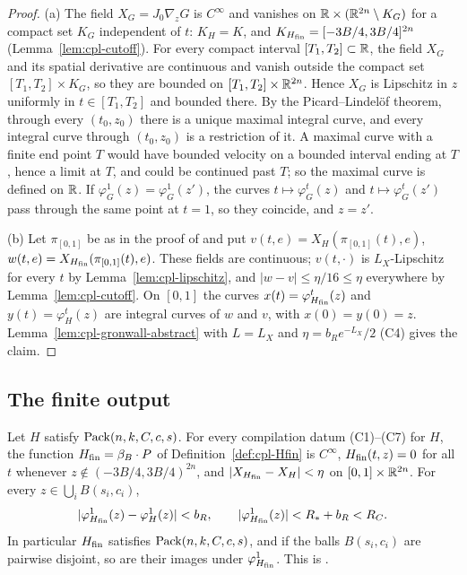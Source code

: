 \begin{proof}
(a) The field $X_G=J_0\nabla_zG$ is $C^\infty$ and vanishes on $\mathbb{R}\times(\mathbb{R}^{2n}\setminus K_G)$ for a compact set
$K_G$ independent of $t$: $K_H=K$, and $K_{H_{\mathrm{fin}}}=[-3B/4,3B/4]^{2n}$ (Lemma~\ref{lem:cpl-cutoff}). For every compact
interval $[T_1,T_2]\subset\mathbb{R}$, the field $X_G$ and its spatial derivative are continuous and vanish outside the
compact set $[T_1,T_2]\times K_G$, so they are bounded on $[T_1,T_2]\times\mathbb{R}^{2n}$. Hence $X_G$ is Lipschitz in $z$
uniformly in $t\in[T_1,T_2]$ and bounded there. By the Picard--Lindel\"of theorem, through every $(t_0,z_0)$ there is
a unique maximal integral curve, and every integral curve through $(t_0,z_0)$ is a restriction of it. A maximal
curve with a finite end point $T$ would have bounded velocity on a bounded interval ending at $T$, hence a limit at
$T$, and could be continued past $T$; so the maximal curve is defined on $\mathbb{R}$. If $\varphi^1_G(z)=\varphi^1_G(z')$,
the curves $t\mapsto\varphi^t_G(z)$ and $t\mapsto\varphi^t_G(z')$ pass through the same point at $t=1$, so they
coincide, and $z=z'$.

(b) Let $\pi_{[0,1]}$ be as in the proof of  and put $v(t,e)=X_H(\pi_{[0,1]}(t),e)$,
$w(t,e)=X_{H_{\mathrm{fin}}}(\pi_{[0,1]}(t),e)$. These fields are continuous; $v(t,\cdot)$ is $L_X$-Lipschitz for every $t$ by
Lemma~\ref{lem:cpl-lipschitz}, and $|w-v|\le\eta/16\le\eta$ everywhere by Lemma~\ref{lem:cpl-cutoff}. On $[0,1]$ the
curves $x(t)=\varphi^t_{H_{\mathrm{fin}}}(z)$ and $y(t)=\varphi^t_H(z)$ are integral curves of $w$ and $v$, with $x(0)=y(0)=z$.
Lemma~\ref{lem:cpl-gronwall-abstract} with $L=L_X$ and $\eta=b_Re^{-L_X}/2$ (C4) gives the claim.
\end{proof}

\subsection{The finite output}\label{sec:cpl-final}

\begin{theorem}\label{thm:cpl-final}
Let $H$ satisfy $\mathrm{Pack}(n,k,C,c,s)$. For every compilation datum (C1)--(C7) for $H$, the function
$H_{\mathrm{fin}}=\beta_B\cdot P$ of Definition~\ref{def:cpl-Hfin} is $C^\infty$, $H_{\mathrm{fin}}(t,z)=0$ for all $t$ whenever
$z\notin(-3B/4,3B/4)^{2n}$, and $|X_{H_{\mathrm{fin}}}-X_H|<\eta$ on $[0,1]\times\mathbb{R}^{2n}$. For every $z\in\bigcup_iB(s_i,c_i)$,
\[
 |\varphi^1_{H_{\mathrm{fin}}}(z)-\varphi^1_H(z)|<b_R,\qquad |\varphi^1_{H_{\mathrm{fin}}}(z)|<R_*+b_R<R_C .
\]
In particular $H_{\mathrm{fin}}$ satisfies $\mathrm{Pack}(n,k,C,c,s)$, and if the balls $B(s_i,c_i)$ are pairwise disjoint, so are
their images under $\varphi^1_{H_{\mathrm{fin}}}$. This is .
\end{theorem}

